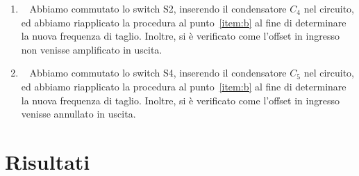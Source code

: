 \documentclass[a4paper]{article}
\begin{document}
\begin{enumerate}[label=\alph*.]
\begin{figure}[h!]
\begin{subfigure}{0.4\textwidth}
							\caption{Segnale con un offset di $ 180 \, \mathrm{mV} $.}
						\end{subfigure}
						\label{fig:punto2.4.3.d}
					\end{figure}
				\item \ 
					\newline
					Abbiamo commutato lo switch S2, inserendo il condensatore $ C_{4} $ nel circuito, ed abbiamo riapplicato la procedura al punto~\ref{item:b} al fine di determinare la nuova frequenza di taglio.
					\newline
					Inoltre, si è verificato come l'offset in ingresso non venisse amplificato in uscita.
				\item \ 
					\newline
					Abbiamo commutato lo switch S4, inserendo il condensatore $ C_{5} $ nel circuito, ed abbiamo riapplicato la procedura al punto~\ref{item:b} al fine di determinare la nuova frequenza di taglio.
					\newline
					Inoltre, si è verificato come l'offset in ingresso venisse annullato in uscita.
			\end{enumerate}
	\section{Risultati}
\end{document}
